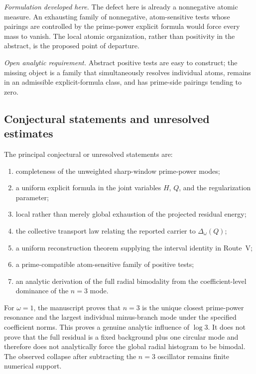 \documentclass[11pt]{amsart}
\numberwithin{equation}{section}
\theoremstyle{plain}
\theoremstyle{definition}
\theoremstyle{remark}
\newcommand{\1}{\mathbf{1}}
\begin{document}
\emph{Formulation developed here.}
The defect here is already a nonnegative atomic measure. An exhausting family
of nonnegative, atom-sensitive tests whose pairings are controlled by the
prime-power explicit formula would force every mass to vanish. The local
atomic organization, rather than positivity in the abstract, is the proposed
point of departure.

\emph{Open analytic requirement.}
Abstract positive tests are easy to construct; the missing object is a family
that simultaneously resolves individual atoms, remains in an admissible
explicit-formula class, and has prime-side pairings tending to zero.

\subsection{Conjectural statements and unresolved estimates}
\label{subsec:conclusion_conjectures}

The principal conjectural or unresolved statements are:
\begin{enumerate}[label=\textup{(\roman*)}]
\item completeness of the unweighted sharp-window prime-power modes;
\item a uniform explicit formula in the joint variables $H$, $Q$, and the
regularization parameter;
\item local rather than merely global exhaustion of the projected residual
energy;
\item the collective transport law relating the reported carrier to
$\Delta_\omega(Q)$;
\item a uniform reconstruction theorem supplying the interval identity in
Route~V;
\item a prime-compatible atom-sensitive family of positive tests;
\item an analytic derivation of the full radial bimodality from the
coefficient-level dominance of the $n=3$ mode.
\end{enumerate}

For $\omega=1$, the manuscript proves that $n=3$ is the unique closest
prime-power resonance and the largest individual minus-branch mode under the
specified coefficient norms. This proves a genuine analytic influence of
$\log3$. It does not prove that the full residual is a fixed background plus
one circular mode and therefore does not analytically force the global radial
histogram to be bimodal. The observed collapse after subtracting the $n=3$
oscillator remains finite numerical support.
\end{document}
